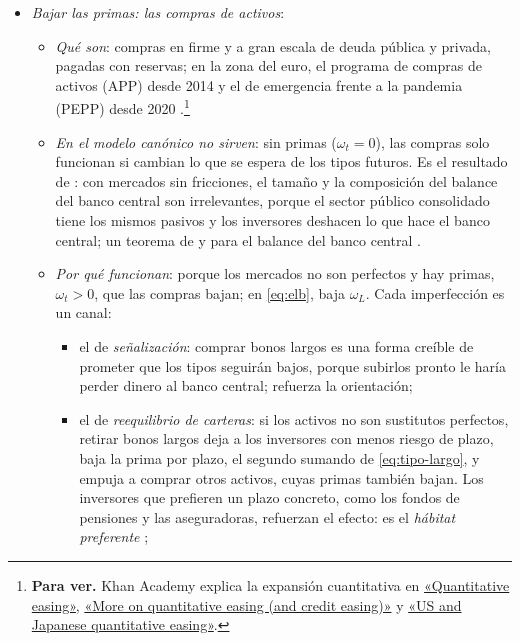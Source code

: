\documentclass[11pt]{article}
\begin{document}
\begin{itemize}
\item \emph{Bajar las primas: las compras de activos}\label{sec:compras}:
  \begin{itemize}
\item \emph{Qué son}: compras en firme y a gran escala de deuda pública y privada, pagadas con reservas; en la zona del euro, el programa de compras de activos (APP) desde 2014 y el de emergencia frente a la pandemia (PEPP) desde 2020\nocite{BCE2026APP,BCE2026PEPP} .\footnote{\textbf{Para ver.} Khan Academy explica la expansión cuantitativa en \href{https://www.khanacademy.org/economics-finance-domain/core-finance/money-and-banking/federal-reserve/v/quantitative-easing}{«Quantitative easing»}, \href{https://www.khanacademy.org/economics-finance-domain/core-finance/money-and-banking/federal-reserve/v/more-on-quantitative-easing-and-credit-easing}{«More on quantitative easing (and credit easing)»} y \href{https://www.khanacademy.org/economics-finance-domain/core-finance/money-and-banking/federal-reserve/v/us-and-japanese-quantitative-easing}{«US and Japanese quantitative easing»}.}
\item \emph{En el modelo canónico no sirven}: sin primas ($\omega_t=0$), las compras solo funcionan si cambian lo que se espera de los tipos futuros\nocite{EggertssonWoodford2003Zero}. Es el resultado de \textcite{Wallace1981ModiglianiMiller}: con mercados sin fricciones, el tamaño y la composición del balance del banco central son irrelevantes, porque el sector público consolidado tiene los mismos pasivos y los inversores deshacen lo que hace el banco central; un teorema de  y  para el balance del banco central .
\item \emph{Por qué funcionan}: porque los mercados no son perfectos y hay primas, $\omega_t>0$, que las compras bajan; en \eqref{eq:elb}, baja $\omega_L$. Cada imperfección es un canal:
  \begin{itemize}
  \item el de \emph{señalización}: comprar bonos largos es una forma creíble de prometer que los tipos seguirán bajos, porque subirlos pronto le haría perder dinero al banco central; refuerza la orientación\nocite{BauerRudebusch2014Signaling};
  \item el de \emph{reequilibrio de carteras}: si los activos no son sustitutos perfectos\nocite{Tobin1969General}, retirar bonos largos deja a los inversores con menos riesgo de plazo, baja la prima por plazo, el segundo sumando de \eqref{eq:tipo-largo}, y empuja a comprar otros activos, cuyas primas también bajan\nocite{GagnonEtAl2011Financial}. Los inversores que prefieren un plazo concreto, como los fondos de pensiones y las aseguradoras, refuerzan el efecto: es el \emph{hábitat preferente}\nocite{VayanosVila2021Preferred} ;

\end{itemize}
\end{itemize}
\end{itemize}
\end{document}
